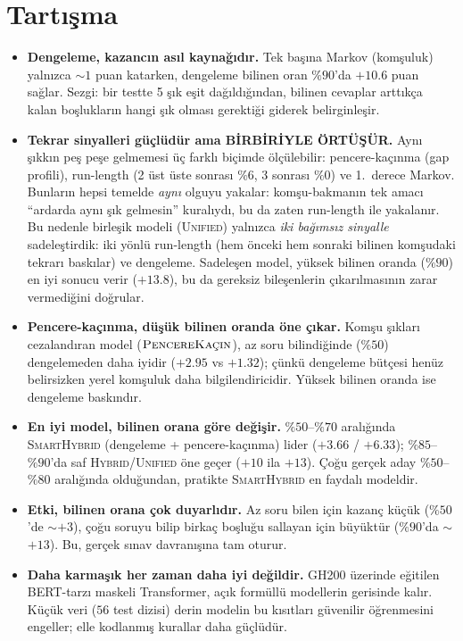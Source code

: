 \documentclass[11pt]{article}
\begin{document}
\section{Tartışma}
\begin{itemize}
  \item \textbf{Dengeleme, kazancın asıl kaynağıdır.} Tek başına Markov
  (komşuluk) yalnızca $\sim 1$ puan katarken, dengeleme bilinen oran
  $\%90$'da $+10.6$ puan sağlar. Sezgi: bir testte 5 şık eşit dağıldığından,
  bilinen cevaplar arttıkça kalan boşlukların hangi şık olması gerektiği
  giderek belirginleşir.
  \item \textbf{Tekrar sinyalleri güçlüdür ama BİRBİRİYLE ÖRTÜŞÜR.} Aynı
  şıkkın peş peşe gelmemesi üç farklı biçimde ölçülebilir: pencere-kaçınma
  (gap profili), run-length (2 üst üste sonrası $\%6$, 3 sonrası $\%0$) ve
  1.\ derece Markov. Bunların hepsi temelde \emph{aynı} olguyu yakalar:
  komşu-bakmanın tek amacı ``ardarda aynı şık gelmesin'' kuralıydı, bu da
  zaten run-length ile yakalanır. Bu nedenle birleşik modeli (\textsc{Unified})
  yalnızca \emph{iki bağımsız sinyalle} sadeleştirdik: iki yönlü run-length
  (hem önceki hem sonraki bilinen komşudaki tekrarı baskılar) ve dengeleme.
  Sadeleşen model, yüksek bilinen oranda ($\%90$) en iyi sonucu verir
  ($+13.8$), bu da gereksiz bileşenlerin çıkarılmasının zarar vermediğini
  doğrular.
  \item \textbf{Pencere-kaçınma, düşük bilinen oranda öne çıkar.} Komşu
  şıkları cezalandıran model ($\textsc{PencereKaçın}$), az soru bilindiğinde
  ($\%50$) dengelemeden daha iyidir ($+2.95$ vs $+1.32$); çünkü dengeleme
  bütçesi henüz belirsizken yerel komşuluk daha bilgilendiricidir. Yüksek
  bilinen oranda ise dengeleme baskındır.
  \item \textbf{En iyi model, bilinen orana göre değişir.} $\%50$--$\%70$
  aralığında \textsc{SmartHybrid} (dengeleme + pencere-kaçınma) lider
  ($+3.66$ / $+6.33$); $\%85$--$\%90$'da saf \textsc{Hybrid}/\textsc{Unified}
  öne geçer ($+10$ ila $+13$). Çoğu gerçek aday $\%50$--$\%80$ aralığında
  olduğundan, pratikte \textsc{SmartHybrid} en faydalı modeldir.
  \item \textbf{Etki, bilinen orana çok duyarlıdır.} Az soru bilen için kazanç
  küçük ($\%50$'de $\sim$$+3$), çoğu soruyu bilip birkaç boşluğu sallayan için
  büyüktür ($\%90$'da $\sim$$+13$). Bu, gerçek sınav davranışına tam oturur.
  \item \textbf{Daha karmaşık her zaman daha iyi değildir.} GH200 üzerinde
  eğitilen BERT-tarzı maskeli Transformer, açık formüllü modellerin gerisinde
  kalır. Küçük veri ($56$ test dizisi) derin modelin bu kısıtları güvenilir
  öğrenmesini engeller; elle kodlanmış kurallar daha güçlüdür.
\end{itemize}
\end{document}
